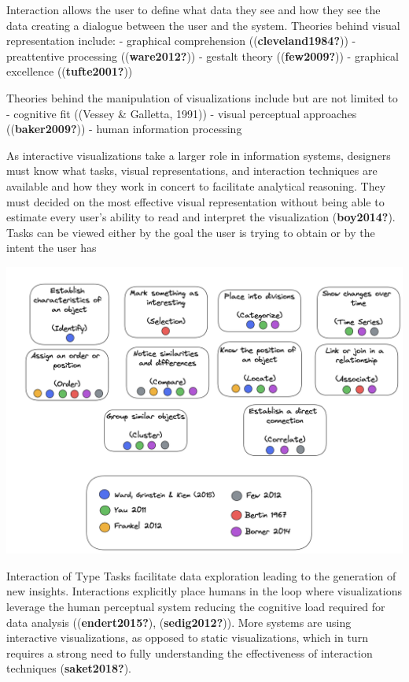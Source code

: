 \documentclass[print]{nuthesis}
\begin{document}
Interaction allows the user to define what data they see and how they see the data creating a dialogue between the user and the system. Theories behind visual representation include:
- graphical comprehension ((\textbf{cleveland1984?}))
- preattentive processing ((\textbf{ware2012?}))
- gestalt theory ((\textbf{few2009?}))
- graphical excellence ((\textbf{tufte2001?}))

Theories behind the manipulation of visualizations include but are not limited to
- cognitive fit ((Vessey \& Galletta, 1991))
- visual perceptual approaches ((\textbf{baker2009?}))
- human information processing

As interactive visualizations take a larger role in information systems, designers must know what tasks, visual representations, and interaction techniques are available and how they work in concert to facilitate analytical reasoning. They must decided on the most effective visual representation without being able to estimate every user's ability to read and interpret the visualization (\textbf{boy2014?}). Tasks can be viewed either by the goal the user is trying to obtain or by the intent the user has

\begin{center}
\includegraphics[width=\textwidth]{figure/tentypetasks}
\end{center}

Interaction of Type Tasks facilitate data exploration leading to the generation of new insights. Interactions explicitly place humans in the loop where visualizations leverage the human perceptual system reducing the cognitive load required for data analysis ((\textbf{endert2015?}), (\textbf{sedig2012?})). More systems are using interactive visualizations, as opposed to static visualizations, which in turn requires a strong need to fully understanding the effectiveness of interaction techniques (\textbf{saket2018?}).
\end{document}

